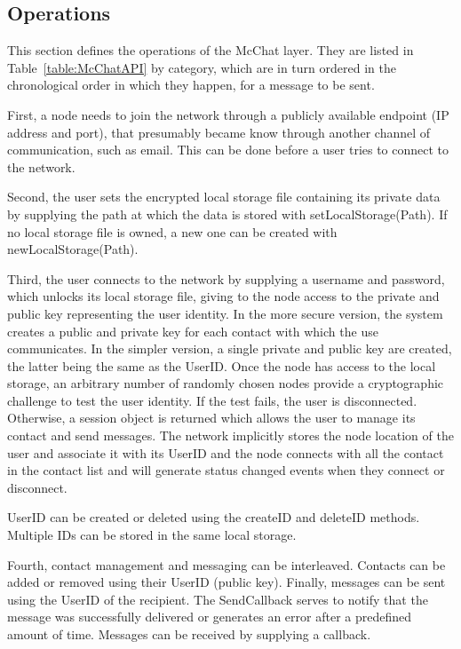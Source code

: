 \subsection{Operations}

This section defines the operations of the McChat layer. They are listed in Table~\ref{table:McChatAPI} by category, which are in turn ordered in the chronological order in which they happen, for a message to be sent.  

First, a node needs to join the network through a publicly available endpoint (IP address and port), that presumably became know through another channel of communication, such as email. This can be done before a user tries to connect to the network.

Second, the user sets the encrypted local storage file containing its private data by supplying the path at which the data is stored with setLocalStorage(Path). If no local storage file is owned, a new one can be created with newLocalStorage(Path).

Third, the user connects to the network by supplying a username and password, which unlocks its local storage file, giving to the node access to the private and public key representing the user identity. In the more secure version, the system creates a public and private key for each contact with which the use communicates. In the simpler version, a single private and public key are created, the latter being the same as the UserID. Once the node has access to the local storage, an arbitrary number of randomly chosen nodes provide a cryptographic challenge to test the user identity. If the test fails, the user is disconnected. Otherwise, a session object is returned which allows the user to manage its contact and send messages. The network implicitly stores the node location of the user and associate it with its UserID and the node connects with all the contact in the contact list and will generate status changed events when they connect or disconnect.

UserID can be created or deleted using the createID and deleteID methods. Multiple IDs can be stored in the same local storage.

Fourth, contact management and messaging can be interleaved. Contacts can be added or removed using their UserID (public key). Finally, messages can be sent using the UserID of the recipient. The SendCallback serves to notify that the message was successfully delivered or generates an error after a predefined amount of time. Messages can be received by supplying a callback.

